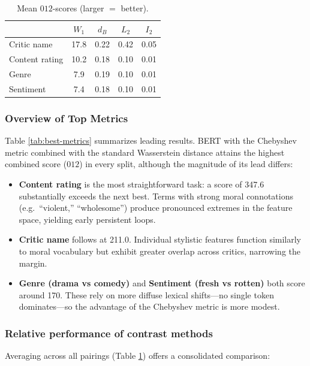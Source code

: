 \documentclass[fleqn,10pt]{SelfArx}
\begin{document}
\begin{table}[H]
  \centering
  \caption{Mean $012$-scores (larger $=$ better).}
  \label{tab:disc-avg}
  \begin{tabular}{lcccc}
  \toprule
                 & $W_1$ & $d_B$ & $L_2$ & $I_2$\\
  \midrule
  Critic name    & 17.8 & 0.22 & 0.42 & 0.05\\
  Content rating & 10.2 & 0.18 & 0.10 & 0.01\\
  Genre          &  7.9 & 0.19 & 0.10 & 0.01\\
  Sentiment      &  7.4 & 0.18 & 0.10 & 0.01\\
  \bottomrule
  \end{tabular}
\end{table}

\subsubsection*{Overview of Top Metrics}
Table \ref{tab:best-metrics} summarizes leading results. BERT with the Chebyshev metric combined with the standard Wasserstein distance attains the highest combined score ($012$) in every split, although the magnitude of its lead differs:

\begin{itemize}[leftmargin=*]
  \item \textbf{Content rating} is the most straightforward task: a score of 347.6 substantially exceeds the next best. Terms with strong moral connotations (e.g.\ “violent,” “wholesome”) produce pronounced extremes in the feature space, yielding early persistent loops.
  \item \textbf{Critic name} follows at 211.0. Individual stylistic features function similarly to moral vocabulary but exhibit greater overlap across critics, narrowing the margin.
  \item \textbf{Genre (drama vs comedy)} and \textbf{Sentiment (fresh vs rotten)} both score around 170. These rely on more diffuse lexical shifts—no single token dominates—so the advantage of the Chebyshev metric is more modest.
\end{itemize}

\subsubsection*{Relative performance of contrast methods}
Averaging across all pairings (Table \ref{tab:disc-avg}) offers a consolidated comparison:
\end{document}
